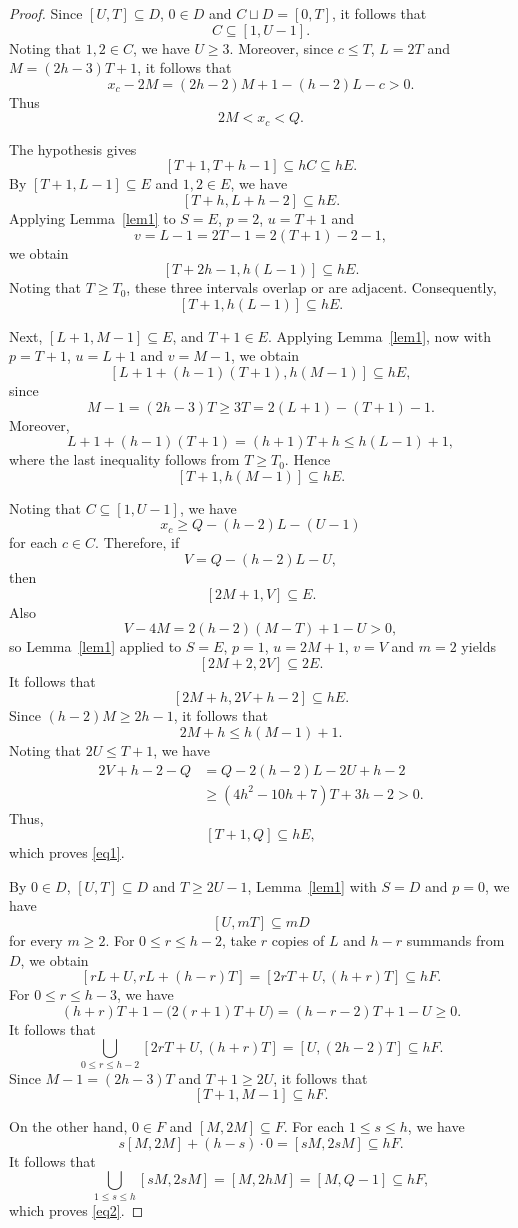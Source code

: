 \documentclass[reqno,12pt,twoside]{article}
\numberwithin{equation}{section}
\begin{document}
\begin{proof}
Since $[U,T]\subseteq D$, $0\in D$ and $C\sqcup D=[0,T]$, it follows that
\[
 C\subseteq[1,U-1].
\]
Noting that $1,2\in C$, we have $U\ge3$.
Moreover, since $c\le T$, $L=2T$ and $M=(2h-3)T+1$, it follows that
\[
 x_c-2M=(2h-2)M+1-(h-2)L-c>0.
\]
Thus
\[
 2M<x_c<Q.
\]

The hypothesis gives
\[
 [T+1,T+h-1]\subseteq hC\subseteq hE.
\]
By $[T+1,L-1]\subseteq E$ and $1,2\in E$, we have 
\[
 [T+h,L+h-2]\subseteq hE.
\]
Applying Lemma~\ref{lem1} to $S=E$, $p=2$, $u=T+1$ and
\[v=L-1=2T-1=2(T+1)-2-1,
\]
we obtain
\[
 [T+2h-1,h(L-1)]\subseteq hE.
\]
Noting that $T\ge T_0$, these three intervals overlap or are adjacent.  Consequently,
\[
 [T+1,h(L-1)]\subseteq hE.
\]

Next, $[L+1,M-1]\subseteq E$, and $T+1\in E$. Applying Lemma~\ref{lem1},
now with $p=T+1$, $u=L+1$ and $v=M-1$, we obtain
\[
 [L+1+(h-1)(T+1),h(M-1)]\subseteq hE,
\]
since
\[
 M-1=(2h-3)T\ge3T=2(L+1)-(T+1)-1.
\]
Moreover,
\[
 L+1+(h-1)(T+1)=(h+1)T+h\le h(L-1)+1,
\]
where the last inequality follows from $T\ge T_0$.  Hence
\[
 [T+1,h(M-1)]\subseteq hE.
\]

Noting that $C\subseteq[1,U-1]$, we have
\[
 x_c\ge Q-(h-2)L-(U-1)
\]
for each $c\in C$.
Therefore, if
\[
 V=Q-(h-2)L-U,
\]
then
\[
 [2M+1,V]\subseteq E.
\]
Also
\[
 V-4M=2(h-2)(M-T)+1-U>0,
\]
so Lemma~\ref{lem1} applied to $S=E$, $p=1$, $u=2M+1$,
$v=V$ and $m=2$ yields
\[
 [2M+2,2V]\subseteq2E.
\]
It follows that
\[
 [2M+h,2V+h-2]\subseteq hE.
\]
Since $(h-2)M\ge2h-1$, it follows that
\[
2M+h\leq h(M-1)+1.
\]  Noting that
$2U\le T+1$, we have
\begin{align*}
 2V+h-2-Q
 &=Q-2(h-2)L-2U+h-2\\
 &\ge(4h^2-10h+7)T+3h-2>0.
\end{align*}  Thus,
\[
 [T+1,Q]\subseteq hE,
\]
which proves \eqref{eq1}.


By $0\in D$, $[U,T]\subseteq D$ and $T\ge2U-1$, Lemma~\ref{lem1}
with $S=D$ and $p=0$, we have
\[
 [U,mT]\subseteq mD
\]
 for every $m\ge2$.
For $0\le r\le h-2$, take $r$ copies of $L$ and $h-r$ summands from
$D$, we obtain
\[
 [rL+U,rL+(h-r)T]
   =[2rT+U,(h+r)T]\subseteq hF.
\]
For $0\le r\le h-3$, we have
\[
 (h+r)T+1-\bigl(2(r+1)T+U\bigr)
 =(h-r-2)T+1-U\ge0.
\]
It follows that 
\[
\bigcup_{0\le r\le h-2}[2rT+U,(h+r)T]=[U,(2h-2)T]\subseteq hF.
\]
  Since $M-1=(2h-3)T$ and $T+1\geq 2U$, it follows that
\[
 [T+1,M-1]\subseteq hF.
\]

On the other hand, $0\in F$ and $[M,2M]\subseteq F$.  For each
$1\le s\le h$, we have
\[
 s[M,2M]+(h-s)\cdot0=[sM,2sM]\subseteq hF.
\]
It follows that 
\[
\bigcup_{1\le s\le h}[sM,2sM]=[M,2hM]=[M,Q-1]\subseteq hF,
\]
which proves \eqref{eq2}.


\end{proof}
\end{document}
